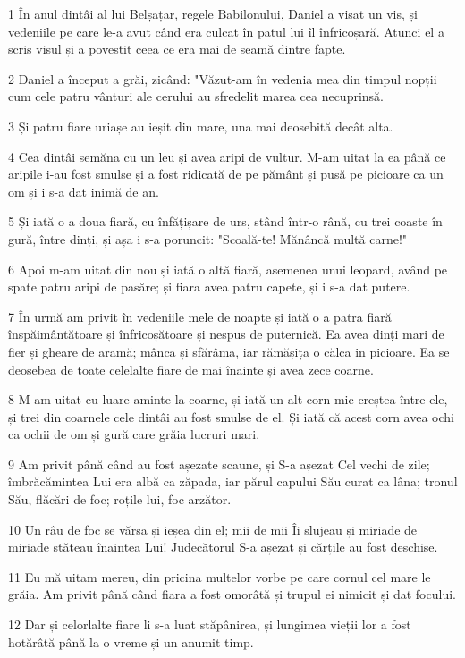 \par 1 În anul dintâi al lui Belșațar, regele Babilonului, Daniel a visat un vis, și vedeniile pe care le-a avut când era culcat în patul lui îl înfricoșară. Atunci el a scris visul și a povestit ceea ce era mai de seamă dintre fapte.
\par 2 Daniel a început a grăi, zicând: "Văzut-am în vedenia mea din timpul nopții cum cele patru vânturi ale cerului au sfredelit marea cea necuprinsă.
\par 3 Și patru fiare uriașe au ieșit din mare, una mai deosebită decât alta.
\par 4 Cea dintâi semăna cu un leu și avea aripi de vultur. M-am uitat la ea până ce aripile i-au fost smulse și a fost ridicată de pe pământ și pusă pe picioare ca un om și i s-a dat inimă de an.
\par 5 Și iată o a doua fiară, cu înfățișare de urs, stând într-o rână, cu trei coaste în gură, între dinți, și așa i s-a poruncit: "Scoală-te! Mănâncă multă carne!"
\par 6 Apoi m-am uitat din nou și iată o altă fiară, asemenea unui leopard, având pe spate patru aripi de pasăre; și fiara avea patru capete, și i s-a dat putere.
\par 7 În urmă am privit în vedeniile mele de noapte și iată o a patra fiară înspăimântătoare și înfricoșătoare și nespus de puternică. Ea avea dinți mari de fier și gheare de aramă; mânca și sfărâma, iar rămășița o călca in picioare. Ea se deosebea de toate celelalte fiare de mai înainte și avea zece coarne.
\par 8 M-am uitat cu luare aminte la coarne, și iată un alt corn mic creștea între ele, și trei din coarnele cele dintâi au fost smulse de el. Și iată că acest corn avea ochi ca ochii de om și gură care grăia lucruri mari.
\par 9 Am privit până când au fost așezate scaune, și S-a așezat Cel vechi de zile; îmbrăcămintea Lui era albă ca zăpada, iar părul capului Său curat ca lâna; tronul Său, flăcări de foc; roțile lui, foc arzător.
\par 10 Un râu de foc se vărsa și ieșea din el; mii de mii Îi slujeau și miriade de miriade stăteau înaintea Lui! Judecătorul S-a așezat și cărțile au fost deschise.
\par 11 Eu mă uitam mereu, din pricina multelor vorbe pe care cornul cel mare le grăia. Am privit până când fiara a fost omorâtă și trupul ei nimicit și dat focului.
\par 12 Dar și celorlalte fiare li s-a luat stăpânirea, și lungimea vieții lor a fost hotărâtă până la o vreme și un anumit timp.
